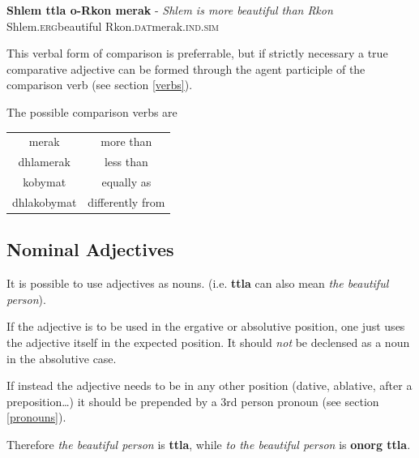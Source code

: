 \documentclass[10pt,oneside]{memoir}
\newcommand{\flav}[1]{  
    \rotatebox[origin=c]{270}{
		\begin{varwidth}{10 cm}
			{\centering \flavan  #1}
		\end{varwidth}
    }
    }
\newcommand{\Flav}[1]{{\Large \flav{#1}}}
\newcommand{\grammar}[1]{\textsc{#1}}
\newcommand{\ERG}{\grammar{erg}}
\newcommand{\DAT}{\grammar{dat}}
\newcommand{\SIM}{\grammar{sim}}
\newcommand{\IND}{\grammar{ind}}
\begin{document}
\begin{center}
	\textbf{Shlem ttla o-Rkon merak} - \emph{Shlem is more beautiful than Rkon}\\
	Shlem.\ERG beautiful Rkon.\DAT merak.\IND.\SIM\\
	\Flav{shlem ttlaa\\orkon merak}
\end{center}

This verbal form of comparison is preferrable, but if strictly necessary a true comparative adjective can be formed through the agent participle of the comparison verb (see section \ref{verbs}).

The possible comparison verbs are

\begin{center}
\begin{tabular}{c | c}
	merak & more than\\
	dhlamerak & less than\\
	kobymat & equally as\\
	dhlakobymat & differently from
\end{tabular}
\end{center}







\subsection{Nominal Adjectives}

It is possible to use adjectives as nouns. (i.e. \textbf{ttla} can also mean \emph{the beautiful person}). 

If the adjective is to be used in the ergative or absolutive position, one just uses the adjective itself in the expected position. It should \emph{not} be declensed as a noun in the absolutive case.

If instead the adjective needs to be in any other position (dative, ablative, after a preposition\ldots) it should be prepended by a 3rd person pronoun (see section \ref{pronouns}).

Therefore \emph{the beautiful person} is \textbf{ttla}, while \emph{to the beautiful person} is \textbf{onorg ttla}.



\pagebreak
\end{document}
